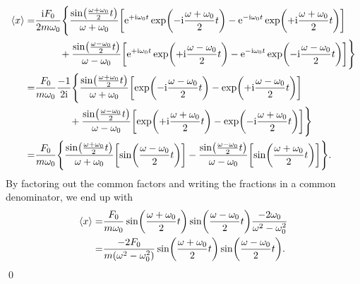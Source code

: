 \documentclass[11pt,letter, swedish, english
]{article}
\begin{document}
\begin{equation}
\begin{aligned}
\ev{x}=&\frac{\ii F_0}{2 m\omega_0}\Bigg\{
\frac{\sin(\frac{\omega+\omega_0}{2}t)}
{\omega+\omega_0}
\qty[
\ee^{+\ii\omega_0t}\exp(-\ii\frac{\omega+\omega_0}{2}t)-
\ee^{-\ii\omega_0t}\exp(+\ii\frac{\omega+\omega_0}{2}t)
] \\ & \hspace{25pt}
+\frac{\sin(\frac{\omega-\omega_0}{2}t)}
{\omega-\omega_0}
\qty[\ee^{+\ii\omega_0t}\exp(+\ii\frac{\omega-\omega_0}{2}t)
-\ee^{-\ii\omega_0t}\exp(-\ii\frac{\omega-\omega_0}{2}t)
]
\Bigg\}\\
=&\frac{F_0}{m\omega_0}\frac{-1}{2\ii}\Bigg\{
\frac{\sin(\frac{\omega+\omega_0}{2}t)}
{\omega+\omega_0}
\qty[
\exp(-\ii\frac{\omega-\omega_0}{2}t)-
\exp(+\ii\frac{\omega-\omega_0}{2}t)
] \\ & \hspace{35pt}
+\frac{\sin(\frac{\omega-\omega_0}{2}t)}
{\omega-\omega_0}
\qty[\exp(+\ii\frac{\omega+\omega_0}{2}t)
-\exp(-\ii\frac{\omega+\omega_0}{2}t)
]
\Bigg\}\\
=&\frac{F_0}{m\omega_0}
\Bigg\{
\frac{\sin(\frac{\omega+\omega_0}{2}t)}
{\omega+\omega_0}
\qty[ \sin(\frac{\omega-\omega_0}{2}t) ] 
-\frac{\sin(\frac{\omega-\omega_0}{2}t)}
{\omega-\omega_0}
\qty[\sin(\frac{\omega+\omega_0}{2}t)
] \Bigg\}.\\
\end{aligned}
\end{equation}
By factoring out the common factors and writing the fractions in a
common denominator, we end up with
\begin{equation}
\begin{aligned}
\ev{x}=&\frac{F_0}{m\omega_0}
\sin(\frac{\omega+\omega_0}{2}t)
\sin(\frac{\omega-\omega_0}{2}t)
\frac{-2\omega_0}{\omega^2-\omega_0^2}\\
=&\frac{-2F_0}{m\qty(\omega^2-\omega_0^2)}
\sin(\frac{\omega+\omega_0}{2}t)
\sin(\frac{\omega-\omega_0}{2}t).
\end{aligned}
\end{equation}
\qed
\end{document}
